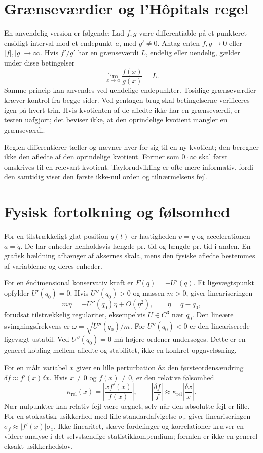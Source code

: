\section{Grænseværdier og l'Hôpitals regel}
\label{sec:hopital}
En anvendelig version er følgende: Lad $f,g$ være differentiable på et punkteret ensidigt interval mod et endepunkt $a$, med $g'\ne0$. Antag enten $f,g\to0$ eller $|f|,|g|\to\infty$. Hvis $f'/g'$ har en grænseværdi $L$, endelig eller uendelig, gælder under disse betingelser
\[
 \lim_{x\to a}\frac{f(x)}{g(x)}=L.
\]
Samme princip kan anvendes ved uendelige endepunkter. Tosidige grænseværdier kræver kontrol fra begge sider. Ved gentagen brug skal betingelserne verificeres igen på hvert trin. Hvis kvotienten af de afledte ikke har en grænseværdi, er testen uafgjort; det beviser ikke, at den oprindelige kvotient mangler en grænseværdi.

Reglen differentierer tæller og nævner hver for sig til en ny kvotient; den beregner ikke den afledte af den oprindelige kvotient. Former som $0\cdot\infty$ skal først omskrives til en relevant kvotient. Taylorudvikling er ofte mere informativ, fordi den samtidig viser den første ikke-nul orden og tilnærmelsens fejl.

\section{Fysisk fortolkning og følsomhed}
\label{sec:fysik}
For en tilstrækkeligt glat position $q(t)$ er hastigheden $v=\dot q$ og accelerationen $a=\ddot q$. De har enheder henholdsvis længde pr. tid og længde pr. tid i anden. En grafisk hældning afhænger af aksernes skala, mens den fysiske afledte bestemmes af variablerne og deres enheder.

For en éndimensional konservativ kraft er $F(q)=-U'(q)$. Et ligevægtspunkt opfylder $U'(q_0)=0$. Hvis $U''(q_0)>0$ og massen $m>0$, giver lineariseringen
\[
 m\ddot\eta=-U''(q_0)\eta+O(\eta^2),\qquad \eta=q-q_0,
\]
forudsat tilstrækkelig regularitet, eksempelvis $U\in C^3$ nær $q_0$. Den lineære svingningsfrekvens er $\omega=\sqrt{U''(q_0)/m}$. For $U''(q_0)<0$ er den lineariserede ligevægt ustabil. Ved $U''(q_0)=0$ må højere ordener undersøges. Dette er en generel kobling mellem afledte og stabilitet, ikke en konkret opgaveløsning.

For en målt variabel $x$ giver en lille perturbation $\delta x$ den førsteordensændring $\delta f\approx f'(x)\delta x$. Hvis $x\ne0$ og $f(x)\ne0$, er den relative følsomhed
\[
 \kappa_{\mathrm{rel}}(x)=\left|\frac{x f'(x)}{f(x)}\right|,\qquad
 \left|\frac{\delta f}{f}\right|\approx\kappa_{\mathrm{rel}}\left|\frac{\delta x}{x}\right|.
\]
Nær nulpunkter kan relativ fejl være uegnet, selv når den absolutte fejl er lille. For en stokastisk usikkerhed med lille standardafvigelse $\sigma_x$ giver lineariseringen $\sigma_f\approx|f'(x)|\sigma_x$. Ikke-linearitet, skæve fordelinger og korrelationer kræver en videre analyse i det selvstændige statistikkompendium; formlen er ikke en generel eksakt usikkerhedslov.

